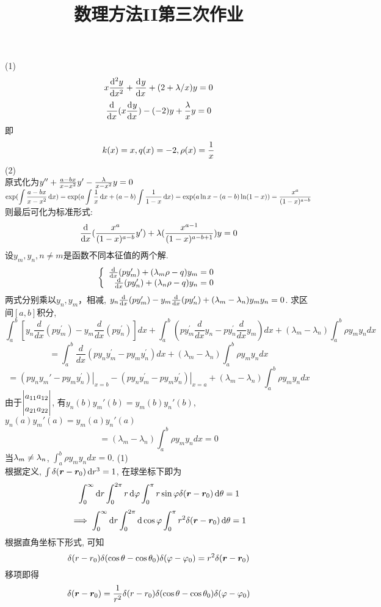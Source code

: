 \documentclass[UTF8,9pt]{ctexart}
\title{数理方法II第三次作业}
\begin{document}
 
\maketitle
{}
(1) 
$$x\dd[2]{y}{x}+\dd{y}{x}+(2+\l/x)y=0$$
$$\dd{}{x}(x\dd{y}{x})-(-2)y+\f{\l}{x}y=0$$
即$$k(x)=x,q(x)=-2, \rho(x)=\ff{x}$$
\newpage
(2)\\
原式化为$y''+\f{a-bx}{x-x^2}y'-\f{\l}{x-x^2}y=0$\\
$\dis\exp(\int\f{a-bx}{x-x^2}\d x)=\exp(a\int\ff{x}\d x+(a-b)\int\ff{1-x}\d x )=\exp( a\ln x-(a-b)\ln(1-x))=\f{x^a}{(1-x)^{a-b}}$\\
则最后可化为标准形式:
$$\dd{}{x}(\f{x^a}{(1-x)^{a-b}}y')+\l(\f{x^{a-1}}{(1-x)^{a-b+1}})y=0$$
\newpage
{}
设$y_m,y_n,n\neq m$是函数不同本征值的两个解. 
$$ 
\left\{\begin{array}{rl}
    \dd{}{x}(py_m')+(\l_m\rho-q)y_m=0\\
    \dd{}{x}(py_n')+(\l_n\rho-q)y_n=0
\end{array}\right.
 $$
两式分别乘以$y_n,y_m$，相减, $y_n\dd{}{x}(py_m')-y_m\dd{}{x}(py_n')+(\l_m-\l_n)y_my_n=0$. 求区间$[a,b]$积分, 
$$
\int_{a}^{b}\left[y_{n} \frac{d}{d x}(p y_{m}^{\prime})-y_{m} \frac{d}{d x}(p y_{n}^{\prime})\right] d x+\int_{a}^{b}(p y_{m}^{\prime} \frac{d}{d x} y_{n}-p y_{n}^{\prime} \frac{d}{d x} y_{m}) d x+(\lambda_{m}-\lambda_{n}) \int_{a}^{b} \rho y_{m} y_{n} d x
 $$
 $$ 
=\int_{a}^{b} \frac{d}{d x}(p y_{n} y_{m}^{\prime}-p y_{m} y_{n}^{\prime}) d x+(\lambda_{m}-\lambda_{n}) \int_{a}^{b} \rho y_{m} y_{n} d x
 $$
 $$ 
=\left.(p y_{n} y_{m}'-p y_{m} y_{n}^{\prime})\right|_{x=b}-\left.(p y_{n} y_{m}^{\prime}-p y_{m} y_{n}^{\prime})\right|_{x=a}+(\lambda_{m}-\lambda_{n}) \int_{a}^{b} \rho y_{m} y_{n} d x
 $$
由于$\abs{\ar{a_{11}&a_{12}\\a_{21}&a_{22}}}$, 有$y_n(b)y_m'(b)=y_m(b)y_n'(b)$, $y_n(a)y_m'(a)=y_m(a)y_n'(a)$
$$=(\lambda_{m}-\lambda_{n}) \int_{a}^{b} \rho y_{m} y_{n} d x = 0$$
当$\l_m\neq \l_n$, $\int_{a}^{b} \rho y_{m} y_{n} d x = 0$.
\newpage
{}
(1)\\
根据定义, $\int\de(\bm{r}-\bm{r}_0)\d r^3 = 1$, 在球坐标下即为
$$\int_0^\infty\d r\int_0^{2\pi}r\d\vp\int_0^{\pi}r\sin\vp\de(\bm{r}-\bm{r}_0)\d\t=1$$
$$\ip\int_0^\infty\d r\int_0^{2\pi}\d\cos\vp\int_0^{\pi}r^2\de(\bm{r}-\bm{r}_0)\d\t=1$$
根据直角坐标下形式, 可知
$$
\delta(r-r_{0}) \delta(\cos \theta-\cos \theta_{0}) \delta(\varphi-\varphi_{0}) = r^2\de(\bm{r}-\bm{r}_0)
 $$
移项即得
$$
\de(\bm{r}-\bm{r}_0) = \ff{r^2}\delta(r-r_{0}) \delta(\cos \theta-\cos \theta_{0}) \delta(\varphi-\varphi_{0})
 $$
\end{document}
